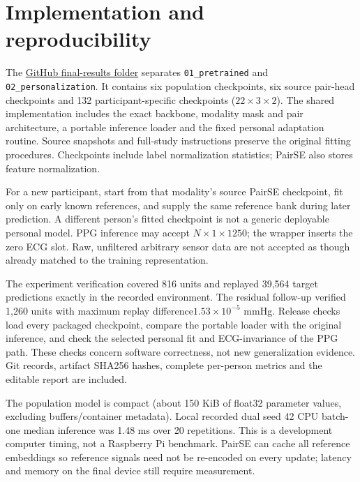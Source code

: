 \documentclass[conference]{IEEEtran}
\begin{document}
\section{Implementation and reproducibility}
The \href{https://github.com/place-bot/Bad-Blood/tree/research/v2-vitaldb-attention-personalization/model\%20training/v2/final_results_20261013}{GitHub final-results folder} separates \texttt{01\_pretrained} and
\texttt{02\_personalization}. It contains six population checkpoints, six
source pair-head checkpoints and 132 participant-specific checkpoints
($22\times3\times2$). The shared implementation includes the exact backbone,
modality mask and pair architecture, a portable inference loader and the fixed
personal adaptation routine. Source snapshots and full-study instructions
preserve the original fitting procedures. Checkpoints include label
normalization statistics; PairSE also stores feature normalization.

For a new participant, start from that modality's source PairSE checkpoint,
fit only on early known references, and supply the same reference bank during
later prediction. A different person's fitted checkpoint is not a generic
deployable personal model. PPG inference may accept $N\times1\times1250$;
the wrapper inserts the zero ECG slot. Raw, unfiltered arbitrary sensor data
are not accepted as though already matched to the training representation.

The experiment verification covered 816 units and replayed 39,564 target
predictions exactly in the recorded environment. The residual follow-up
verified 1,260 units with maximum replay difference$1.53\times10^{-5}$ mmHg.
Release checks load every packaged checkpoint, compare the portable loader
with the original inference, and check the selected personal fit and
ECG-invariance of the PPG path. These checks concern software correctness,
not new generalization evidence. Git records, artifact SHA256 hashes, complete
per-person metrics and the editable report are included.

The population model is compact (about 150 KiB of float32 parameter values,
excluding buffers/container metadata). Local recorded dual seed 42 CPU
batch-one median inference was 1.48 ms over 20 repetitions. This is a development
computer timing, not a Raspberry Pi benchmark. PairSE can cache all reference
embeddings so reference signals need not be re-encoded on every update;
latency and memory on the final device still require measurement.
\end{document}
